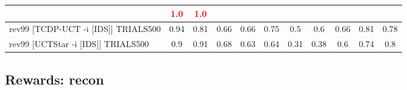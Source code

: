 \documentclass{article}
\begin{document}
\begin{tabular}{|l|r@{$\pm$}rr@{$\pm$}rr@{$\pm$}rr@{$\pm$}rr@{$\pm$}rr@{$\pm$}rr@{$\pm$}rr@{$\pm$}rr@{$\pm$}rr@{$\pm$}r|}
& \multicolumn{2}{c}{\textbf{\textcolor{red}{1.0}}}
& \multicolumn{2}{c|}{\textbf{\textcolor{red}{1.0}}}
\\
\hline
rev99 [TCDP-UCT -i [IDS]] TRIALS500
& \multicolumn{2}{c}{0.94}
& \multicolumn{2}{c}{0.81}
& \multicolumn{2}{c}{0.66}
& \multicolumn{2}{c}{0.66}
& \multicolumn{2}{c}{0.75}
& \multicolumn{2}{c}{0.5}
& \multicolumn{2}{c}{0.6}
& \multicolumn{2}{c}{0.66}
& \multicolumn{2}{c}{0.81}
& \multicolumn{2}{c|}{0.78}
\\
rev99 [UCTStar -i [IDS]] TRIALS500
& \multicolumn{2}{c}{0.9}
& \multicolumn{2}{c}{0.91}
& \multicolumn{2}{c}{0.68}
& \multicolumn{2}{c}{0.63}
& \multicolumn{2}{c}{0.64}
& \multicolumn{2}{c}{0.31}
& \multicolumn{2}{c}{0.38}
& \multicolumn{2}{c}{0.6}
& \multicolumn{2}{c}{0.74}
& \multicolumn{2}{c|}{0.8}
\\
\hline
\end{tabular}%

\bigskip

\subsection*{Rewards: recon}
\end{document}
